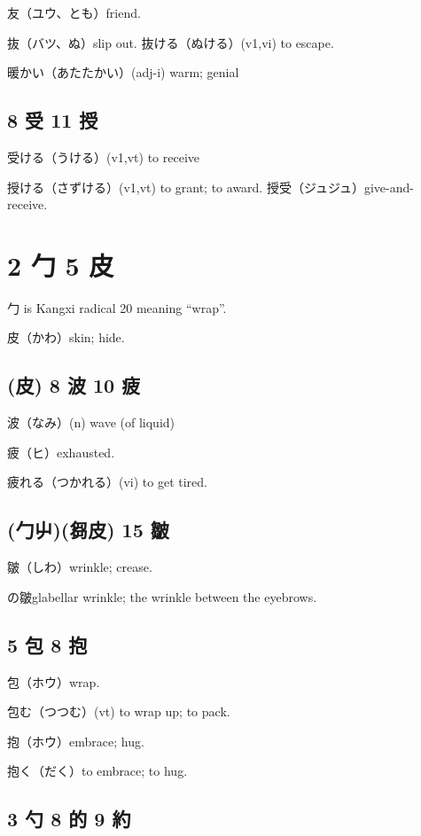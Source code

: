 友（ユウ、とも）friend.

抜（バツ、ぬ）slip out.
抜ける（ぬける）(v1,vi) to escape.

暖かい（あたたかい）(adj-i) warm; genial

\subsection{8 受 11 授}

受ける（うける）(v1,vt) to receive

授ける（さずける）(v1,vt) to grant; to award.
授受（ジュジュ）give-and-receive.

\section{2 勹 5 皮}

勹 is Kangxi radical 20 meaning ``wrap''.

皮（かわ）skin; hide.

\subsection{(皮) 8 波 10 疲}

波（なみ）(n) wave (of liquid)

疲（ヒ）exhausted.

疲れる（つかれる）(vi) to get tired.

\subsection{(勹屮)(芻皮) 15 皺}

皺（しわ）wrinkle; crease.

の皺glabellar wrinkle; the wrinkle between the eyebrows.

\subsection{5 包 8 抱}

包（ホウ）wrap.

包む（つつむ）(vt) to wrap up; to pack.

抱（ホウ）embrace; hug.

抱く（だく）to embrace; to hug.

\subsection{3 勺 8 的 9 約}

